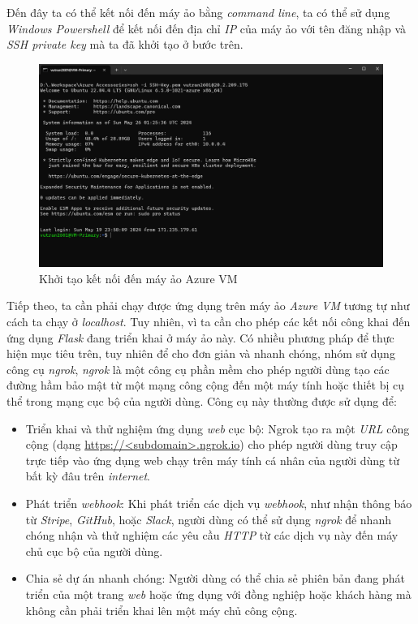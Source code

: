 \hspace*{1cm}
Đến đây ta có thể kết nối đến máy ảo bằng \textit{command line}, ta có thể sử dụng \textit{Windows Powershell} để kết nối đến địa chỉ \textit{IP} của máy ảo với tên đăng nhập và \textit{SSH private key} mà ta đã khởi tạo ở bước trên.
\begin{figure}[H]
    \centering
    \includegraphics[width=1\textwidth]{Images/Deployment/HybridSearch/VM-Connection.png}
    \caption{Khởi tạo kết nối đến máy ảo Azure VM}
\end{figure}
\hspace*{1cm}
Tiếp theo, ta cần phải chạy được ứng dụng trên máy ảo \textit{Azure VM} tương tự như cách ta chạy ở \textit{localhost}. Tuy nhiên, vì ta cần cho phép các kết nối công khai đến ứng dụng \textit{Flask} đang triển khai ở máy ảo này. Có nhiều phương pháp để thực hiện mục tiêu trên, tuy nhiên để cho đơn giản và nhanh chóng, nhóm sử dụng công cụ \textit{ngrok}, \textit{ngrok} là một công cụ phần mềm cho phép người dùng tạo các đường hầm bảo mật từ một mạng công cộng đến một máy tính hoặc thiết bị cụ thể trong mạng cục bộ của người dùng. Công cụ này thường được sử dụng để:
\begin{itemize}
    \item Triển khai và thử nghiệm ứng dụng \textit{web} cục bộ: Ngrok tạo ra một \textit{URL} công cộng (dạng \url{https://<subdomain>.ngrok.io}) cho phép người dùng truy cập trực tiếp vào ứng dụng web chạy trên máy tính cá nhân của người dùng từ bất kỳ đâu trên \textit{internet}.
    \item Phát triển \textit{webhook}: Khi phát triển các dịch vụ \textit{webhook}, như nhận thông báo từ \textit{Stripe}, \textit{GitHub}, hoặc \textit{Slack}, người dùng có thể sử dụng \textit{ngrok} để nhanh chóng nhận và thử nghiệm các yêu cầu \textit{HTTP} từ các dịch vụ này đến máy chủ cục bộ của người dùng.
    \item Chia sẻ dự án nhanh chóng: Người dùng có thể chia sẻ phiên bản đang phát triển của một trang \textit{web} hoặc ứng dụng với đồng nghiệp hoặc khách hàng mà không cần phải triển khai lên một máy chủ công cộng.
\end{itemize}
